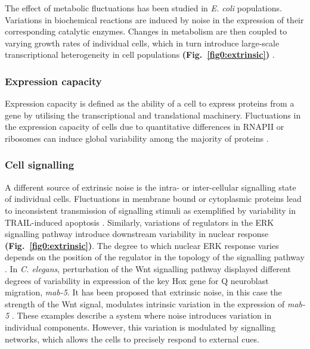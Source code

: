 The effect of metabolic fluctuations has been studied in \textit{E. coli} populations. 
Variations in biochemical reactions are induced by noise in the expression of their corresponding catalytic enzymes. 
Changes in metabolism are then coupled to varying growth rates of individual cells, which in turn introduce large-scale transcriptional heterogeneity in cell populations \textbf{(Fig.~\ref{fig0:extrinsic})} \citep{Kiviet2014}.  

\subsubsection{Expression capacity}

Expression capacity is defined as the ability of a cell to express proteins from a gene by utilising the transcriptional and translational machinery. 
Fluctuations in the expression capacity of cells due to quantitative differences in RNAPII or ribosomes can induce global variability among the majority of proteins \citep{Colman-Lerner2005}.

\newpage

\subsubsection{Cell signalling}

A different source of extrinsic noise is the intra- or inter-cellular signalling state of individual cells. 
Fluctuations in membrane bound or cytoplasmic proteins lead to inconsistent transmission of signalling stimuli as exemplified by variability in \gls{TRAIL}-induced apoptosis \citep{Spencer2009}. 
Similarly, variations of regulators in the \gls{ERK} signalling pathway introduce downstream variability in nuclear response \textbf{(Fig.~\ref{fig0:extrinsic})}. 
The degree to which nuclear ERK response varies depends on the position of the regulator in the topology of the signalling pathway \citep{Iwamoto2016}. 
In \textit{C. elegans}, perturbation of the Wnt signalling pathway displayed different degrees of variability in expression of the key Hox gene for Q neuroblast migration, \textit{mab-5}. 
It has been proposed that extrinsic noise, in this case the strength of the Wnt signal, modulates intrinsic variation in the expression of \textit{mab-5} \citep{Ji2013}. 
These examples describe a system where noise introduces variation in individual components. 
However, this variation is modulated by signalling networks, which allows the cells to precisely respond to external cues. 

